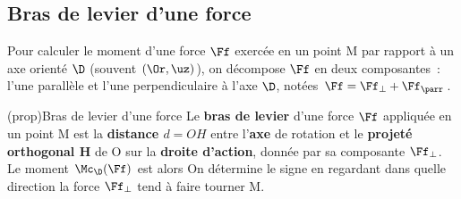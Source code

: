 \documentclass[../../main/main.tex]{subfiles}
\begin{document}
\subsection{Bras de levier d'une force}
Pour calculer le moment d'une force $\Ff$ exercée en un point M par rapport à un
axe orienté $\D$ (souvent $(\Or,\uz)$), on décompose $\Ff$ en deux composantes~:
l'une parallèle et l'une perpendiculaire à l'axe $\D$, notées $\Ff = \Ff_{\perp}
	+ \Ff_{\parr}$.
\begin{center}
\end{center}
\begin{tcb*}(prop){Bras de levier d'une force}
	Le \textbf{bras de levier} d'une force $\Ff$ appliquée en un point M est la
	\textbf{distance $d = OH$} entre l'\textbf{axe} de rotation et le
	\textbf{projeté orthogonal H} de O sur la \textbf{droite d'action}, donnée par
	sa composante $\Ff_{\perp}$. Le moment $\Mc_{\D}(\Ff)$ est alors
	\psw{
		\[
			\boxed{
				\Mc_{\D}(\Ff) =
				\OMr \cdot \norm{\Ff_{\perp}} \sin(\a) =
				\pm d\norm{\Ff_{\perp}}
			}
		\]
	}
	On détermine le signe en regardant dans quelle direction la force
	$\Ff_{\perp}$ tend à faire tourner M.
\end{tcb*}
\end{document}
